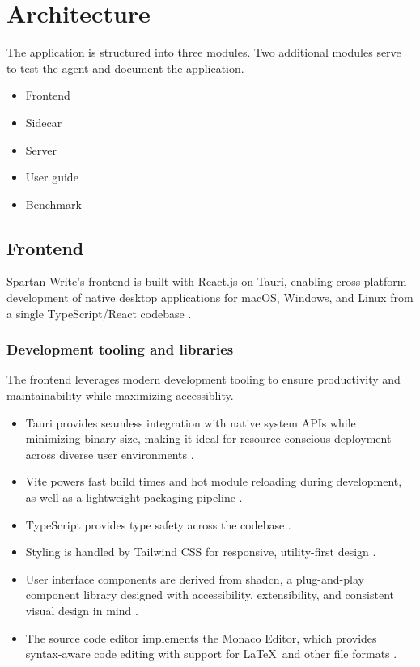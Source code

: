 \section{Architecture}

The application is structured into three modules.
Two additional modules serve to test the agent and document the application.

\begin{itemize}
    \item Frontend
    \item Sidecar
    \item Server
    \item User guide
    \item Benchmark
\end{itemize}

\subsection{Frontend}

Spartan Write's frontend is built with React.js \cite{react} on Tauri, enabling cross-platform development of native desktop applications for macOS, Windows, and Linux from a single TypeScript/React codebase \cite{tauri}.

\subsubsection{Development tooling and libraries}

The frontend leverages modern development tooling to ensure productivity and maintainability while maximizing accessiblity.

\begin{itemize}
    \item Tauri provides seamless integration with native system APIs while minimizing binary size, making it ideal for resource-conscious deployment across diverse user environments \cite{tauri}.
    \item Vite powers fast build times and hot module reloading during development, as well as a lightweight packaging pipeline \cite{vite}.
    \item TypeScript provides type safety across the codebase \cite{typescript}.
    \item Styling is handled by Tailwind CSS for responsive, utility-first design \cite{tailwind}.
    \item User interface components are derived from shadcn, a plug-and-play component library designed with accessibility, extensibility, and consistent visual design in mind \cite{shadcn}.
    \item The source code editor implements the Monaco Editor, which provides syntax-aware code editing with support for \LaTeX\ and other file formats \cite{monaco}.
\end{itemize}

